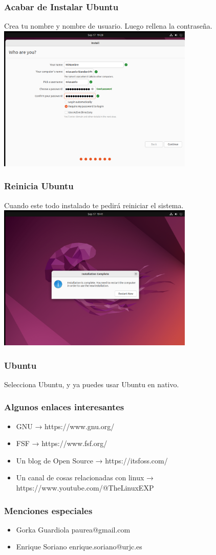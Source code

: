 \documentclass[10pt]{beamer}
\begin{document}
	\begin{frame}
		\frametitle{Acabar de Instalar Ubuntu}
		Crea tu nombre y nombre de usuario. Luego rellena la contraseña.
		\includegraphics[width=0.7\textwidth]{login}
	\end{frame}
	
	\begin{frame}
		\frametitle{Reinicia Ubuntu}
		Cuando este todo instalado te pedirá reiniciar el sistema.
		\includegraphics[width=0.7\textwidth]{restart}
	\end{frame}
	
	\begin{frame}
		\frametitle{Ubuntu}
		Selecciona Ubuntu, y ya puedes usar Ubuntu en nativo.
	\end{frame}
	
	\begin{frame}
		\frametitle{Algunos enlaces interesantes}
		\begin{itemize}
			\item GNU → https://www.gnu.org/
			\item FSF → https://www.fsf.org/
			\item Un blog de Open Source → https://itsfoss.com/
			\item Un canal de cosas relacionadas con linux → https://www.youtube.com/@TheLinuxEXP
		\end{itemize}
	\end{frame}
	
	\begin{frame}
		\frametitle{Menciones especiales}
		\begin{itemize}
			\item Gorka Guardiola paurea@gmail.com
			\item Enrique Soriano enrique.soriano@urjc.es
		\end{itemize}
	\end{frame}
\end{document}
